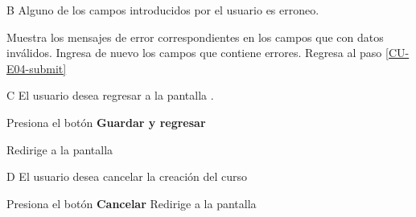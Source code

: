 \begin{UCtrayectoriaA}{B}{%
Alguno de los campos introducidos por el usuario es erroneo.
}

  \Sistema Muestra los mensajes de error correspondientes en los campos que
           con datos inválidos.
  \Actor Ingresa de nuevo los campos que contiene errores.
  \Sistema Regresa al paso \ref{CU-E04-submit}

\end{UCtrayectoriaA}

\begin{UCtrayectoriaA}{C}{%
El usuario desea regresar a la pantalla .
}

  \Actor Presiona el botón {\bf Guardar y regresar}

  \Sistema Redirige a la pantalla 

\end{UCtrayectoriaA}

\begin{UCtrayectoriaA}{D}{%
El usuario desea cancelar la creación del curso
}

  \Actor Presiona el botón {\bf Cancelar}
  \Sistema Redirige a la pantalla 

\end{UCtrayectoriaA}
